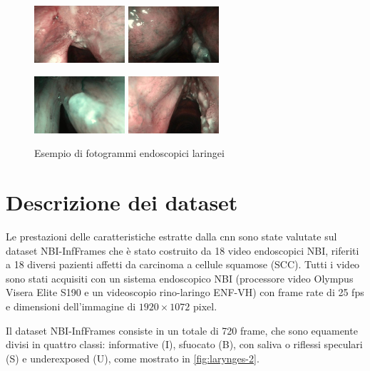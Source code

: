 \begin{figure}[ht]
    \centering
    \includegraphics[width=0.3\textwidth]{introduzione/Larynge-1.jpg}
    \includegraphics[width=0.3\textwidth]{introduzione/Larynge-2.jpg}

    \includegraphics[width=0.3\textwidth]
    {introduzione/Larynge-3.jpg}
    \includegraphics[width=0.3\textwidth]{introduzione/Larynge-4.jpg}
    \caption{Esempio di fotogrammi endoscopici laringei}
    \label{fig:larynges}
\end{figure}

\section{Descrizione dei dataset}\label{descrizione-dei-dataset}

Le prestazioni delle caratteristiche estratte dalla
\gls{cnn} sono state valutate sul dataset
NBI-InfFrames  che
è stato costruito da 18 video endoscopici NBI, riferiti a
18 diversi pazienti affetti da carcinoma a cellule squamose
(SCC). Tutti i video sono stati acquisiti con un sistema endoscopico
NBI (processore video Olympus Visera Elite S190 e
un videoscopio rino-laringo ENF-VH) con frame rate di
25 fps e dimensioni dell'immagine di \(1920\times 1072\) pixel.

Il dataset NBI-InfFrames consiste in un totale di 720 frame, che sono equamente divisi in quattro classi: informative (I), sfuocato (B), con saliva o riflessi speculari (S) e underexposed  (U), come mostrato in \cref{fig:larynges-2}. 

